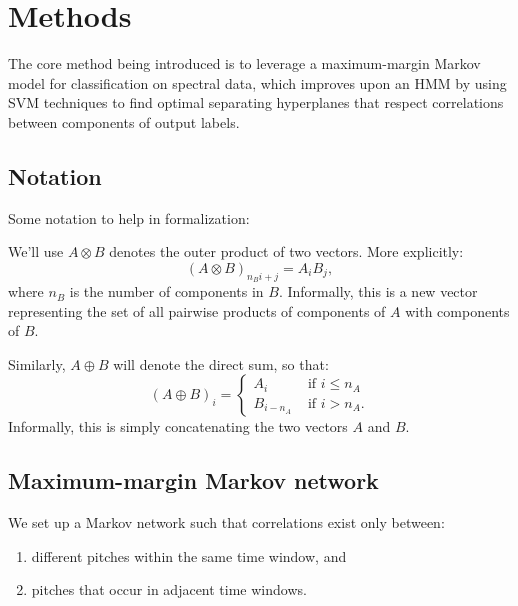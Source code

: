 \documentclass{article}
\begin{document}
\section{Methods}
\newcommand{\x}{\mathbf{x}}
\newcommand{\y}{\mathbf{y}}
\newcommand{\w}{\mathbf{w}}
\newcommand{\f}{\mathbf{f}}

The core method being introduced is to leverage a
maximum-margin Markov model \cite{Taskar03max-marginmarkov} for classification
on spectral data, which improves
upon an HMM by using SVM techniques to find optimal separating hyperplanes
that respect correlations between components of output labels.


\subsection{Notation}
Some notation to help in formalization:

We'll use $A \otimes B$ denotes the outer product of two vectors. More
explicitly:
\[ (A \otimes B)_{n_Bi+j} = A_iB_j, \]
where $n_B$ is the number of components in $B$. Informally, this is
a new vector representing the set of all pairwise products of components of
$A$ with components of $B$.

Similarly, $A \oplus B$ will denote the direct sum, so that:
\[ (A \oplus B)_i =
      \begin{cases} A_i & \text{ if $i \le n_A$} \\
                    B_{i-n_A} & \text{ if $i > n_A$}.
      \end{cases}
\]
Informally, this is simply concatenating the two vectors $A$ and $B$.

\subsection{Maximum-margin Markov network}
We set up a Markov network such that correlations exist only between:
\begin{enumerate}
\item different pitches within the same time window, and
\item pitches that occur in adjacent time windows.
\end{enumerate}

\end{document}
